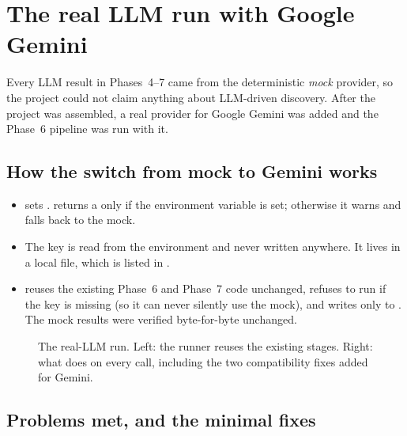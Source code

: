 \section{The real LLM run with Google Gemini}\label{sec:gemini}

Every LLM result in Phases~4--7 came from the deterministic \emph{mock} provider, so the project could not claim
anything about LLM-driven discovery. After the project was assembled, a real provider for Google Gemini was added
and the Phase~6 pipeline was run with it.

\subsection{How the switch from mock to Gemini works}

\begin{itemize}
  \item {} sets .  returns a  only
        if the environment variable  is set; otherwise it warns and falls back to the mock.
  \item The key is read from the environment and never written anywhere. It lives in a local  file,
        which is listed in .
  \item {} reuses the existing Phase~6 and Phase~7 code unchanged, refuses to
        run if the key is missing (so it can never silently use the mock), and writes only to
        . The mock results were verified byte-for-byte unchanged.
\end{itemize}

\begin{figure}[!htb]
\centering

\pkglegend
\caption{The real-LLM run. Left: the runner reuses the existing stages. Right: what 
does on every call, including the two compatibility fixes added for Gemini.}
\label{fig:gemini}
\end{figure}

\subsection{Problems met, and the minimal fixes}

